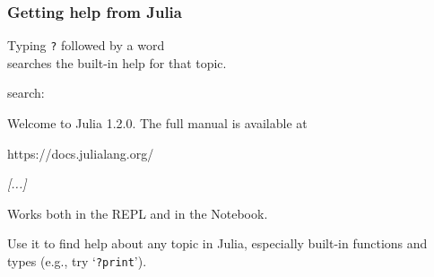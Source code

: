 \documentclass[english,serif,mathserif,xcolor=pdftex,dvipsnames,table]{beamer}
\begin{document}
\begin{frame}[fragile]
  \frametitle{Getting help from Julia}
  Typing \texttt{?} followed by a word \\ searches the built-in help for
  that topic.
\begin{semiverbatim}\smaller
{}
\Out
search:

  Welcome to Julia 1.2.0. The full manual is available at

  https://docs.julialang.org/

  {\itshape [...]}
\end{semiverbatim}

  Works both in the REPL and in the Notebook.

  \+ Use it to find help about any topic in Julia, especially built-in
  functions and types (e.g., try `\texttt{?print}').
\end{frame}
\end{document}
